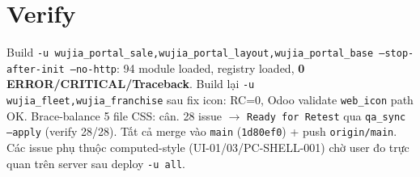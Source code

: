 \section{Verify}

Build \texttt{-u wujia\_portal\_sale,wujia\_portal\_layout,wujia\_portal\_base --stop-after-init --no-http}:
94 module loaded, registry loaded, \textbf{0 ERROR/CRITICAL/Traceback}. Build lại
\texttt{-u wujia\_fleet,wujia\_franchise} sau fix icon: RC=0, Odoo validate \texttt{web\_icon} path OK.
Brace-balance 5 file CSS: cân. 28 issue $\to$ \texttt{Ready for Retest} qua \texttt{qa\_sync --apply}
(verify 28/28). Tất cả merge vào \texttt{main} (\texttt{1d80ef0}) + push \texttt{origin/main}. Các issue
phụ thuộc computed-style (UI-01/03/PC-SHELL-001) chờ user đo trực quan trên server sau deploy \texttt{-u all}.
